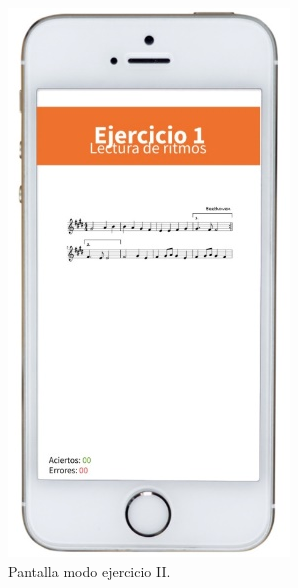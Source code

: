 \documentclass[spanish]{textolivre}
\begin{document}
\hfill
\begin{minipage}[b]{0.30\textwidth}
    \begin{figure}[H]
        \centering
        \includegraphics[width=\linewidth]{Fig6.png}
        \caption{Pantalla modo ejercicio II.}
    \end{figure}
\end{minipage}
\end{document}
